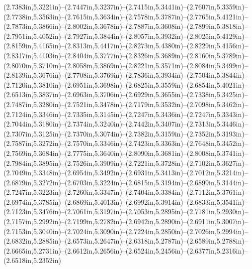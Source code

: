 (2.7383in,5.3221in)--(2.7447in,5.3237in)--(2.7415in,5.3441in)--(2.7607in,5.3359in)--(2.7738in,5.3563in)--(2.7615in,5.3634in)--(2.7578in,5.3787in)--(2.7765in,5.4121in)--(2.7873in,5.3866in)--(2.8002in,5.3678in)--(2.7887in,5.3608in)--(2.7899in,5.3818in)--(2.7951in,5.4052in)--(2.7927in,5.3844in)--(2.8057in,5.3932in)--(2.8025in,5.4129in)--(2.8159in,5.4165in)--(2.8313in,5.4417in)--(2.8273in,5.4380in)--(2.8229in,5.4156in)--(2.8317in,5.4103in)--(2.8404in,5.3777in)--(2.8326in,5.3689in)--(2.8160in,5.3789in)--(2.8070in,5.3710in)--(2.8058in,5.3869in)--(2.8221in,5.3571in)--(2.8084in,5.3499in)--(2.8139in,5.3676in)--(2.7708in,5.3769in)--(2.7836in,5.3934in)--(2.7504in,5.3844in)--(2.7120in,5.3810in)--(2.6951in,5.3698in)--(2.6825in,5.3559in)--(2.6854in,5.4021in)--(2.6513in,5.3837in)--(2.6963in,5.3706in)--(2.6929in,5.3655in)--(2.7338in,5.3425in)--(2.7487in,5.3280in)--(2.7521in,5.3478in)--(2.7179in,5.3532in)--(2.7098in,5.3462in)--(2.7124in,5.3346in)--(2.7335in,5.3145in)--(2.7247in,5.3436in)--(2.7247in,5.3343in)--(2.7044in,5.3180in)--(2.7374in,5.3240in)--(2.7442in,5.3407in)--(2.7313in,5.3446in)--(2.7307in,5.3125in)--(2.7370in,5.3074in)--(2.7382in,5.3159in)--(2.7352in,5.3193in)--(2.7587in,5.3272in)--(2.7570in,5.3346in)--(2.7423in,5.3363in)--(2.7648in,5.3452in)--(2.7569in,5.3684in)--(2.7775in,5.3640in)--(2.8090in,5.3681in)--(2.8008in,5.3741in)--(2.7984in,5.3895in)--(2.7526in,5.3909in)--(2.7221in,5.3728in)--(2.7102in,5.3627in)--(2.7049in,5.3348in)--(2.6954in,5.3492in)--(2.6931in,5.3413in)--(2.7012in,5.3214in)--(2.6879in,5.3272in)--(2.6703in,5.3224in)--(2.6815in,5.3194in)--(2.6899in,5.3144in)--(2.7247in,5.3223in)--(2.7260in,5.3347in)--(2.7404in,5.3384in)--(2.7112in,5.3761in)--(2.6974in,5.3785in)--(2.6869in,5.4013in)--(2.6992in,5.3914in)--(2.6833in,5.3541in)--(2.7123in,5.3476in)--(2.7061in,5.3197in)--(2.7053in,5.2895in)--(2.7181in,5.2930in)--(2.7157in,5.2992in)--(2.7199in,5.2782in)--(2.6942in,5.2890in)--(2.6911in,5.3007in)--(2.7153in,5.3040in)--(2.7024in,5.3090in)--(2.7224in,5.2850in)--(2.7026in,5.2994in)--(2.6832in,5.2885in)--(2.6573in,5.2647in)--(2.6318in,5.2787in)--(2.6589in,5.2788in)--(2.6665in,5.2731in)--(2.6612in,5.2656in)--(2.6524in,5.2456in)--(2.6377in,5.2316in)--(2.6518in,5.2352in)
